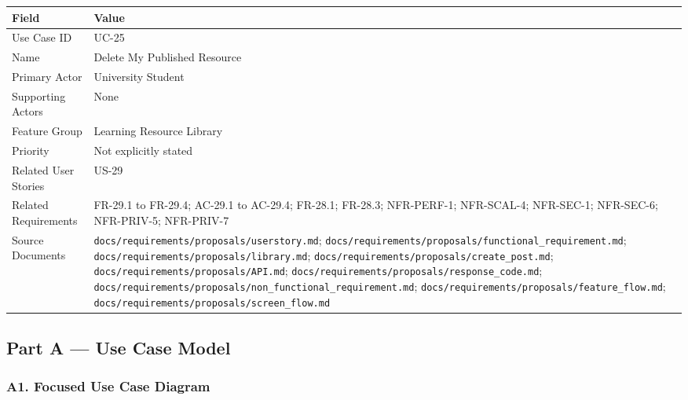 \documentclass[12pt]{article}
\renewcommand{\baselinestretch}{1.5}
\begin{document}
\begingroup
\small
\renewcommand{\baselinestretch}{1.0}\selectfont
\renewcommand{\arraystretch}{1.15}
\setlength{\tabcolsep}{6pt}
\begin{longtable}{|>{\raggedright\arraybackslash}p{}|>{\raggedright\arraybackslash}p{}|}
\hline
\textbf{Field} & \textbf{Value} \\ \hline
\endhead
Use Case ID & UC-25 \\ \hline
Name & Delete My Published Resource \\ \hline
Primary Actor & University Student \\ \hline
Supporting Actors & None \\ \hline
Feature Group & Learning Resource Library \\ \hline
Priority & Not explicitly stated \\ \hline
Related User Stories & US-29 \\ \hline
Related Requirements & FR-29.1 to FR-29.4; AC-29.1 to AC-29.4; FR-28.1; FR-28.3; NFR-PERF-1; NFR-SCAL-4; NFR-SEC-1; NFR-SEC-6; NFR-PRIV-5; NFR-PRIV-7 \\ \hline
Source Documents & \texttt{docs/requirements/proposals/userstory.md}; \texttt{docs/requirements/proposals/functional\_requirement.md}; \texttt{docs/requirements/proposals/library.md}; \texttt{docs/requirements/proposals/create\_post.md}; \texttt{docs/requirements/proposals/API.md}; \texttt{docs/requirements/proposals/response\_code.md}; \texttt{docs/requirements/proposals/non\_functional\_requirement.md}; \texttt{docs/requirements/proposals/feature\_flow.md}; \texttt{docs/requirements/proposals/screen\_flow.md} \\ \hline
\end{longtable}
\endgroup
\par\medskip

\hypertarget{sec:part-a-use-case-model}{}
\subsection*{Part A --- Use Case Model}
\par\medskip

\hypertarget{sec:a1-focused-use-case-diagram}{}
\subsubsection*{A1. Focused Use Case Diagram}
\par\medskip
\end{document}
